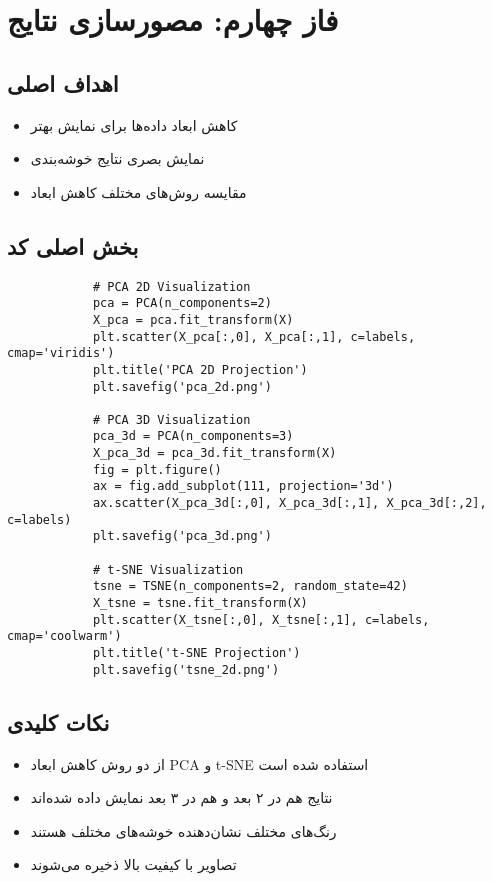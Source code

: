 \documentclass[a4paper,12pt]{article}
\let\nobreaksection\section
\renewcommand{\section}{\nobreaksection}  %
\begin{document}
	\section{فاز چهارم: مصورسازی نتایج}
	
	\subsection{اهداف اصلی}
	\begin{itemize}
		\item کاهش ابعاد داده‌ها برای نمایش بهتر
		\item نمایش بصری نتایج خوشه‌بندی
		\item مقایسه روش‌های مختلف کاهش ابعاد
	\end{itemize}
	
	\subsection{بخش اصلی کد}
	\begin{latin}
		\begin{verbatim}
			# PCA 2D Visualization
			pca = PCA(n_components=2)
			X_pca = pca.fit_transform(X)
			plt.scatter(X_pca[:,0], X_pca[:,1], c=labels, cmap='viridis')
			plt.title('PCA 2D Projection')
			plt.savefig('pca_2d.png')
			
			# PCA 3D Visualization
			pca_3d = PCA(n_components=3)
			X_pca_3d = pca_3d.fit_transform(X)
			fig = plt.figure()
			ax = fig.add_subplot(111, projection='3d')
			ax.scatter(X_pca_3d[:,0], X_pca_3d[:,1], X_pca_3d[:,2], c=labels)
			plt.savefig('pca_3d.png')
			
			# t-SNE Visualization
			tsne = TSNE(n_components=2, random_state=42)
			X_tsne = tsne.fit_transform(X)
			plt.scatter(X_tsne[:,0], X_tsne[:,1], c=labels, cmap='coolwarm')
			plt.title('t-SNE Projection')
			plt.savefig('tsne_2d.png')
		\end{verbatim}
	\end{latin}
	
	\subsection{نکات کلیدی}
	\begin{itemize}
		\item از دو روش کاهش ابعاد PCA و t-SNE استفاده شده است
		\item نتایج هم در ۲ بعد و هم در ۳ بعد نمایش داده شده‌اند
		\item رنگ‌های مختلف نشان‌دهنده خوشه‌های مختلف هستند
		\item تصاویر با کیفیت بالا ذخیره می‌شوند
	\end{itemize}
	
\end{document}
